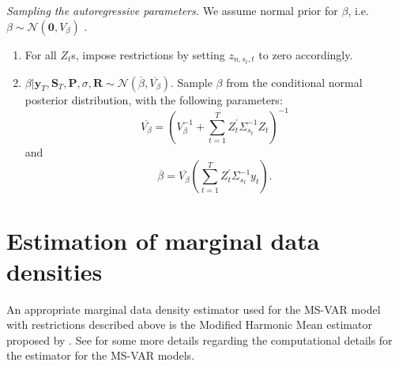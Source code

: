 \documentclass[final,3p,authoryear]{elsarticle}
\begin{document}
\begin{al}\label{al:beta} \textit{Sampling the autoregressive parameters.} We assume normal prior for $\beta$, i.e. $\beta \sim \mathcal{N}(\mathbf{0}, V_{\beta}) $ .
	\begin{enumerate}
		\item For all $Z_t$s, impose restrictions by setting $z_{n,s_t,t}$ to zero accordingly.
        \item $\beta | \mathbf{y}_T , \mathbf{S}_T , \mathbf{P}, \sigma,\mathbf{R} \sim  \mathcal{N}(\overline{\beta}, \overline{V_{\beta}})$. Sample $\beta$ from the conditional normal posterior distribution, with the following parameters:
\begin{equation}
  \overline{V_{\beta}} = \left( V^{-1}_{\beta} + \sum_{t=1}^{T} Z^{'}_t \Sigma_{s_t}^{-1} Z_t \right)^{-1}            
    \nonumber
\end{equation} and
\begin{equation}
  \overline{\beta} = \overline{V_{\beta}} \left(  \sum_{t=1}^{T} Z^{'}_t \Sigma_{s_t}^{-1} y_t\right).
    \nonumber
\end{equation} 
	\end{enumerate}
\end{al}             





\section{Estimation of marginal data densities}

\noindent An appropriate marginal data density estimator used for the MS-VAR model with restrictions described above is the Modified Harmonic Mean estimator proposed by \cite{Geweke1999,Geweke2005}. See \cite{Droumaguet2012} for some more details regarding the computational details for the estimator for the MS-VAR models.









 
















\newpage
%
\end{document}
